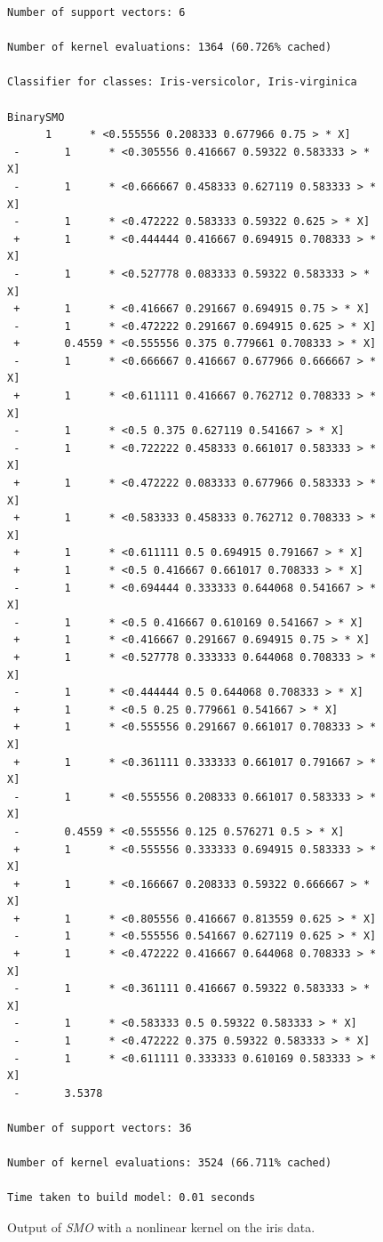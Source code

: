 \begin{figure}[!p]
\begin{mdframed}[innermargin=-1.0cm]
\begin{Verbatim}[fontsize=\tiny]
Number of support vectors: 6

Number of kernel evaluations: 1364 (60.726% cached)

Classifier for classes: Iris-versicolor, Iris-virginica

BinarySMO
      1      * <0.555556 0.208333 0.677966 0.75 > * X]
 -       1      * <0.305556 0.416667 0.59322 0.583333 > * X]
 -       1      * <0.666667 0.458333 0.627119 0.583333 > * X]
 -       1      * <0.472222 0.583333 0.59322 0.625 > * X]
 +       1      * <0.444444 0.416667 0.694915 0.708333 > * X]
 -       1      * <0.527778 0.083333 0.59322 0.583333 > * X]
 +       1      * <0.416667 0.291667 0.694915 0.75 > * X]
 -       1      * <0.472222 0.291667 0.694915 0.625 > * X]
 +       0.4559 * <0.555556 0.375 0.779661 0.708333 > * X]
 -       1      * <0.666667 0.416667 0.677966 0.666667 > * X]
 +       1      * <0.611111 0.416667 0.762712 0.708333 > * X]
 -       1      * <0.5 0.375 0.627119 0.541667 > * X]
 -       1      * <0.722222 0.458333 0.661017 0.583333 > * X]
 +       1      * <0.472222 0.083333 0.677966 0.583333 > * X]
 +       1      * <0.583333 0.458333 0.762712 0.708333 > * X]
 +       1      * <0.611111 0.5 0.694915 0.791667 > * X]
 +       1      * <0.5 0.416667 0.661017 0.708333 > * X]
 -       1      * <0.694444 0.333333 0.644068 0.541667 > * X]
 -       1      * <0.5 0.416667 0.610169 0.541667 > * X]
 +       1      * <0.416667 0.291667 0.694915 0.75 > * X]
 +       1      * <0.527778 0.333333 0.644068 0.708333 > * X]
 -       1      * <0.444444 0.5 0.644068 0.708333 > * X]
 +       1      * <0.5 0.25 0.779661 0.541667 > * X]
 +       1      * <0.555556 0.291667 0.661017 0.708333 > * X]
 +       1      * <0.361111 0.333333 0.661017 0.791667 > * X]
 -       1      * <0.555556 0.208333 0.661017 0.583333 > * X]
 -       0.4559 * <0.555556 0.125 0.576271 0.5 > * X]
 +       1      * <0.555556 0.333333 0.694915 0.583333 > * X]
 +       1      * <0.166667 0.208333 0.59322 0.666667 > * X]
 +       1      * <0.805556 0.416667 0.813559 0.625 > * X]
 -       1      * <0.555556 0.541667 0.627119 0.625 > * X]
 +       1      * <0.472222 0.416667 0.644068 0.708333 > * X]
 -       1      * <0.361111 0.416667 0.59322 0.583333 > * X]
 -       1      * <0.583333 0.5 0.59322 0.583333 > * X]
 -       1      * <0.472222 0.375 0.59322 0.583333 > * X]
 -       1      * <0.611111 0.333333 0.610169 0.583333 > * X]
 -       3.5378

Number of support vectors: 36

Number of kernel evaluations: 3524 (66.711% cached)

Time taken to build model: 0.01 seconds
\end{Verbatim}
\end{mdframed}
\caption{\label{fig:smo_nonlinear_output}Output of \textit{SMO} with a nonlinear kernel on the iris data.}
\end{figure}

